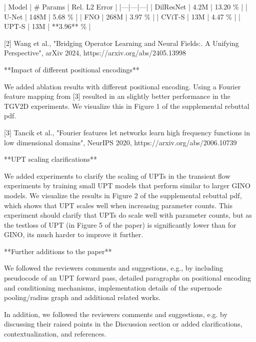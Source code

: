 | Model | # Params | Rel. L2 Error  |
|---|---|---|
| DilResNet | 4.2M | 13.20 \%  |
| U-Net | 148M | 5.68 \%  |
| FNO | 268M | 3.97 \%  |
| CViT-S | 13M | 4.47 \%  |
| UPT-S | 13M | **3.96** \%  |

[2] Wang et al., "Bridging Operator Learning and Neural Fields:. A Unifying Perspective", arXiv 2024, https://arxiv.org/abs/2405.13998

**Impact of different positional encodings**

We added ablation results with different positional encoding.
Using a Fourier feature mapping from [3] resulted in an slightly better performance in the TGV2D experiments. We visualize this in Figure 1 of the supplemental rebuttal pdf.

[3] Tancik et al., "Fourier features let networks learn high frequency functions in low dimensional domains", NeurIPS 2020, https://arxiv.org/abs/2006.10739


**UPT scaling clarifications**

We added experiments to clarify the scaling of UPTs in the transient flow experiments by training small UPT models that perform similar to larger GINO models. We visualize the results in Figure 2 of the supplemental rebuttal pdf, which shows that UPT scales well when increasing parameter counts. This experiment should clarify that UPTs do scale well with parameter counts, but as the testloss of UPT (in Figure 5 of the paper) is significantly lower than for GINO, its much harder to improve it further.


**Further additions to the paper**

We followed the reviewers comments and suggestions, e.g., by including pseudocode of an UPT forward pass, detailed paragraphs on positional encoding and conditioning mechanisms, implementation details of the supernode pooling/radius graph and additional related works.


In addition, we followed the reviewers comments and suggestions, e.g. by discussing their raised points in the Discussion section or added clarifications, contextualization, and references.




